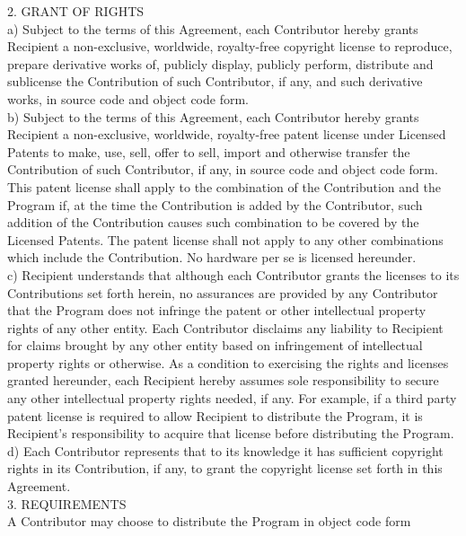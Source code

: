 {2. GRANT OF RIGHTS
\\[4pt]
      a) Subject to the terms of this Agreement, each Contributor
      hereby grants Recipient a non-exclusive, worldwide, royalty-free
      copyright license to reproduce, prepare derivative works of,
      publicly display, publicly perform, distribute and sublicense
      the Contribution of such Contributor, if any, and such
      derivative works, in source code and object code form.
\\[4pt]
      b) Subject to the terms of this Agreement, each Contributor
      hereby grants Recipient a non-exclusive, worldwide, royalty-free
      patent license under Licensed Patents to make, use, sell, offer
      to sell, import and otherwise transfer the Contribution of such
      Contributor, if any, in source code and object code form. This
      patent license shall apply to the combination of the
      Contribution and the Program if, at the time the Contribution is
      added by the Contributor, such addition of the Contribution
      causes such combination to be covered by the Licensed
      Patents. The patent license shall not apply to any other
      combinations which include the Contribution. No hardware per se
      is licensed hereunder.
\\[4pt]
      c) Recipient understands that although each Contributor grants
      the licenses to its Contributions set forth herein, no
      assurances are provided by any Contributor that the Program does
      not infringe the patent or other intellectual property rights of
      any other entity. Each Contributor disclaims any liability to
      Recipient for claims brought by any other entity based on
      infringement of intellectual property rights or otherwise. As a
      condition to exercising the rights and licenses granted
      hereunder, each Recipient hereby assumes sole responsibility to
      secure any other intellectual property rights needed, if
      any. For example, if a third party patent license is required to
      allow Recipient to distribute the Program, it is Recipient's
      responsibility to acquire that license before distributing the
      Program.
\\[4pt]
      d) Each Contributor represents that to its knowledge it has
      sufficient copyright rights in its Contribution, if any, to
      grant the copyright license set forth in this Agreement.
\\[4pt]
3. REQUIREMENTS
\\[4pt]
A Contributor may choose to distribute the Program in object code form
}
